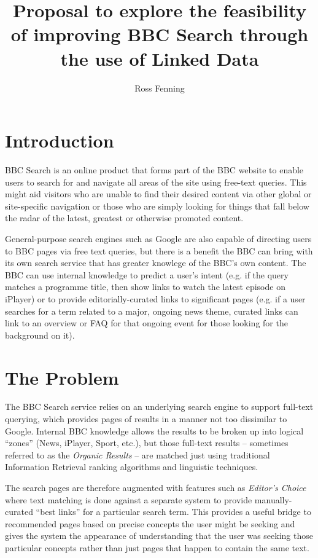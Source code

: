 \documentclass[10pt,a4paper]{article}
\title{Proposal to explore the feasibility of improving BBC Search through the use of Linked Data}
\author{Ross Fenning}
\begin{document}
\maketitle
\thispagestyle{empty}

\section{Introduction}

BBC Search is an online product that forms part of the BBC website
to enable users to search for and navigate all areas of the site using
free-text queries. This might aid visitors who are unable to find their desired
content via other global or site-specific navigation or those who are simply
looking for things that fall below the radar of the latest, greatest or
otherwise promoted content.

General-purpose search engines such as Google are also capable of directing
users to BBC pages via free text queries, but there is a benefit the BBC
can bring with its own search service that has greater knowlege of the
BBC's own content. The BBC can use internal knowledge to predict a user's
intent (e.g. if the query matches a programme title, then show links to watch
the latest episode on iPlayer) or to provide editorially-curated
links to significant pages (e.g. if a user searches for a term
related to a major, ongoing news theme, curated links can
link to an overview or FAQ for that ongoing event for those
looking for the background on it).

\section{The Problem}

The BBC Search service relies on an underlying search engine to support
full-text querying, which provides pages of results in a manner not
too dissimilar to Google. Internal BBC knowledge allows the results
to be broken up into logical ``zones'' (News, iPlayer, Sport, etc.),
but those full-text results
-- sometimes referred to as the \emph{Organic Results} -- are matched
just using traditional Information Retrieval ranking
algorithms and linguistic techniques.

The search pages are therefore augmented with features such as
\emph{Editor's Choice} where text matching is done against a separate
system to provide manually-curated ``best links'' for a particular
search term. This provides a useful bridge to recommended pages based
on precise concepts the user might be seeking and gives the system
the appearance of understanding that the user was seeking those
particular concepts rather than just pages that happen to contain
the same text.
\end{document}

